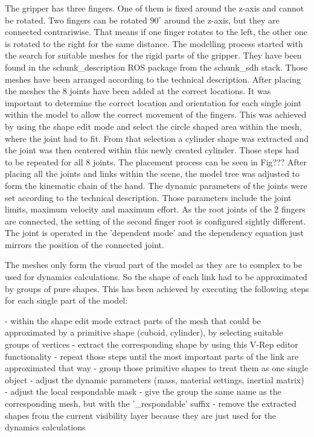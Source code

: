 The gripper has three fingers. One of them is fixed around the z-axis and cannot be rotated. Two fingers can be rotated $90^\circ$ around the z-axis, but they are connected contrariwise. That means if one finger rotates to the left, the other one is rotated to the right for the same distance.
The modelling process started with the search for suitable meshes for the rigid parts of the gripper. They have been found in the schunk\_description ROS package from the schunk\_sdh stack. Those meshes have been arranged according to the technical description. After placing the meshes the 8 joints have been added at the correct locations. It was important to determine the correct location and orientation for each single joint within the model to allow the correct movement of the fingers. This was achieved by using the shape edit mode and select the circle shaped area within the mesh, where the joint had to fit. From that selection a cylinder shape was extracted and the joint was then centered within this newly created cylinder. Those steps had to be repeated for all 8 joints. The placement process can be seen in Fig??? After placing all the joints and links within the scene, the model tree was adjusted to form the kinematic chain of the hand. The dynamic parameters of the joints were set according to the technical description. Those parameters include the joint limits, maximum velocity and maximum effort. As the root joints of the 2 fingers are connected, the setting of the second finger root is configured sightly different. The joint is operated in the 'dependent mode' and the dependency equation just mirrors the position of the connected joint.

The meshes only form the visual part of the model as they are to complex to be used for dynamics calculations. So the shape of each link had to be approximated by groups of pure shapes. This has been achieved by executing the following steps for each single part of the model:

- within the shape edit mode extract parts of the mesh that could be approximated by a primitive
  shape (cuboid, cylinder), by selecting suitable groups of vertices
- extract the corresponding shape by using this V-Rep editor functionality
- repeat those steps until the most important parts of the link are approximated that way
- group those primitive shapes to treat them as one single object
- adjust the dynamic parameters (mass, material settings, inertial matrix)
- adjust the local respondable mask
- give the group the same name as the corresponding mesh, but with the '\_respondable' suffix
- remove the extracted shapes from the current visibility layer because they are just used for the
  dynamics calculations


